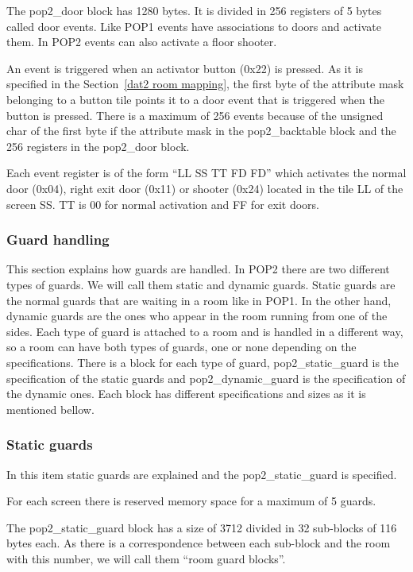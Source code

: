 \documentclass{article}
\begin{document}
 The pop2\_door block has 1280 bytes. It is divided in 256 registers of
 5 bytes called door events. Like POP1 events have associations to doors
 and activate them. In POP2 events can also activate a floor shooter.
 
 An event is triggered when an activator button (0x22) is pressed. As it is
 specified in the Section~\ref{dat2 room mapping}, the first byte of the attribute mask
 belonging to a button tile points it to a door event that is triggered
 when the button is pressed.
 There is a maximum of 256 events because of the unsigned char of the first
 byte if the attribute mask in the pop2\_backtable block and the 256
 registers in the pop2\_door block.

 Each event register is of the form ``LL SS TT FD FD'' which activates the
 normal door (0x04), right exit door (0x11) or shooter (0x24) located in
 the tile LL of the screen SS. TT is 00 for normal activation and FF for
 exit doors.

\subsubsection{Guard handling} %
 This section explains how guards are handled. In POP2 there are two
 different types of guards. We will call them static and dynamic guards.
 Static guards are the normal guards that are waiting in a room like in
 POP1. In the other hand, dynamic guards are the ones who appear in the
 room running from one of the sides. Each type of guard is attached to a
 room and is handled in a different way, so a room can have both types of
 guards, one or none depending on the specifications. There is a block for
 each type of guard, pop2\_static\_guard is the specification of the static
 guards and pop2\_dynamic\_guard is the specification of the dynamic ones.
 Each block has different specifications and sizes as it is mentioned
 bellow.
 
\subsubsection{Static guards} %
 
 In this item static guards are explained and the pop2\_static\_guard is
 specified.
 
 For each screen there is reserved memory space for a maximum of 5 guards.
 
 The pop2\_static\_guard block has a size of 3712 divided in 32 sub-blocks of
 116 bytes each. As there is a correspondence between each sub-block and
 the room with this number, we will call them ``room guard blocks''.
 
\end{document}
